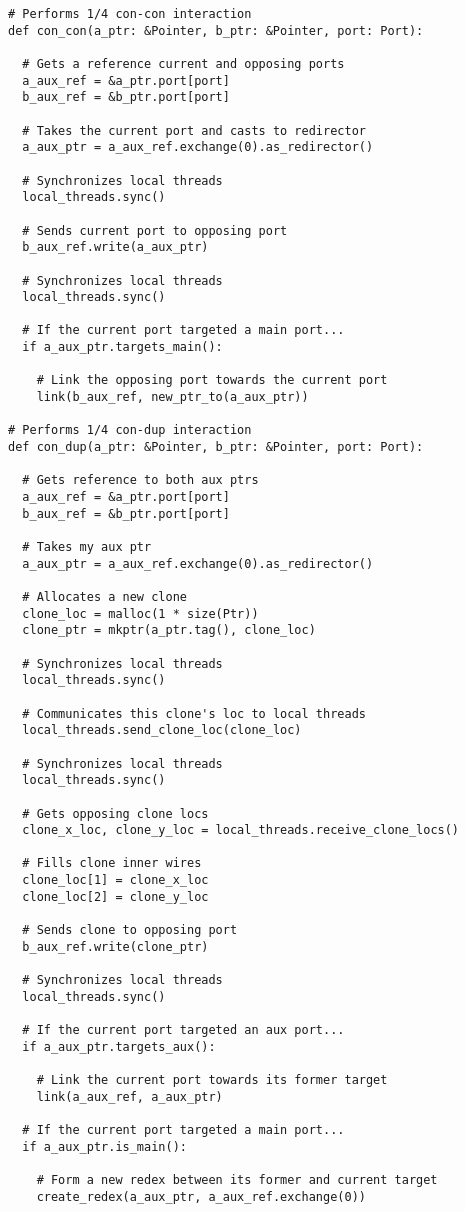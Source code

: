 \documentclass{article}
\begin{document}
\begin{lstlisting}
# Performs 1/4 con-con interaction
def con_con(a_ptr: &Pointer, b_ptr: &Pointer, port: Port):

  # Gets a reference current and opposing ports
  a_aux_ref = &a_ptr.port[port]
  b_aux_ref = &b_ptr.port[port]

  # Takes the current port and casts to redirector
  a_aux_ptr = a_aux_ref.exchange(0).as_redirector()

  # Synchronizes local threads
  local_threads.sync()

  # Sends current port to opposing port
  b_aux_ref.write(a_aux_ptr)

  # Synchronizes local threads
  local_threads.sync()

  # If the current port targeted a main port...
  if a_aux_ptr.targets_main():

    # Link the opposing port towards the current port
    link(b_aux_ref, new_ptr_to(a_aux_ptr))

# Performs 1/4 con-dup interaction
def con_dup(a_ptr: &Pointer, b_ptr: &Pointer, port: Port):
  
  # Gets reference to both aux ptrs
  a_aux_ref = &a_ptr.port[port]
  b_aux_ref = &b_ptr.port[port]

  # Takes my aux ptr
  a_aux_ptr = a_aux_ref.exchange(0).as_redirector()

  # Allocates a new clone
  clone_loc = malloc(1 * size(Ptr))
  clone_ptr = mkptr(a_ptr.tag(), clone_loc)

  # Synchronizes local threads
  local_threads.sync()

  # Communicates this clone's loc to local threads
  local_threads.send_clone_loc(clone_loc)

  # Synchronizes local threads
  local_threads.sync()

  # Gets opposing clone locs
  clone_x_loc, clone_y_loc = local_threads.receive_clone_locs()

  # Fills clone inner wires
  clone_loc[1] = clone_x_loc
  clone_loc[2] = clone_y_loc

  # Sends clone to opposing port
  b_aux_ref.write(clone_ptr)

  # Synchronizes local threads
  local_threads.sync()

  # If the current port targeted an aux port...
  if a_aux_ptr.targets_aux():

    # Link the current port towards its former target
    link(a_aux_ref, a_aux_ptr)

  # If the current port targeted a main port...
  if a_aux_ptr.is_main():

    # Form a new redex between its former and current target
    create_redex(a_aux_ptr, a_aux_ref.exchange(0))
\end{lstlisting}
\end{document}
